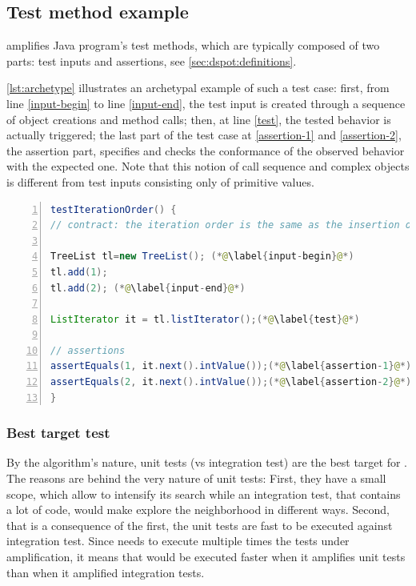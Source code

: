 \subsection{Test method example}
\label{subsec:dspot:overview:appliance-to-unit-test}

\dspot amplifies Java program's test methods, which are typically composed of two parts: test inputs and assertions, see \autoref{sec:dspot:definitions}.

\autoref{lst:archetype} illustrates an archetypal example of such a test case: 
first, from line \autoref{input-begin} to line \autoref{input-end}, the test input is created through a sequence of object creations and method calls; 
then, at line \autoref{test}, the tested behavior is actually triggered; 
the last part of the test case at \autoref{assertion-1} and \autoref{assertion-2}, the assertion part, specifies and checks the conformance of the observed behavior with the expected one.
Note that this notion of call sequence and complex objects is different from test inputs consisting only of primitive values.

\begin{lstlisting}[caption={An example of an object-oriented test case  (inspired from Apache Commons Collections)},label=lst:archetype,float,language=java,numbers=left] 
testIterationOrder() {
// contract: the iteration order is the same as the insertion order

TreeList tl=new TreeList(); (*@\label{input-begin}@*)
tl.add(1);
tl.add(2); (*@\label{input-end}@*)

ListIterator it = tl.listIterator();(*@\label{test}@*)

// assertions
assertEquals(1, it.next().intValue());(*@\label{assertion-1}@*)
assertEquals(2, it.next().intValue());(*@\label{assertion-2}@*)
}
\end{lstlisting}

\subsubsection{Best target test}
\label{subsubsec:dspot:overview:appliance-to-unit-test:target-test}

By the algorithm's nature, unit tests (vs integration test) are the best target for \dspot.
The reasons are behind the very nature of unit tests:
First, they have a small scope, which allow \dspot to intensify its search while an integration test, that contains a lot of code, would make \dspot explore the neighborhood in different ways.
Second, that is a consequence of the first, the unit tests are fast to be executed against integration test.
Since \dspot needs to execute multiple times the tests under amplification, it means that \dspot would be executed faster when it amplifies unit tests than when it amplified integration tests.

